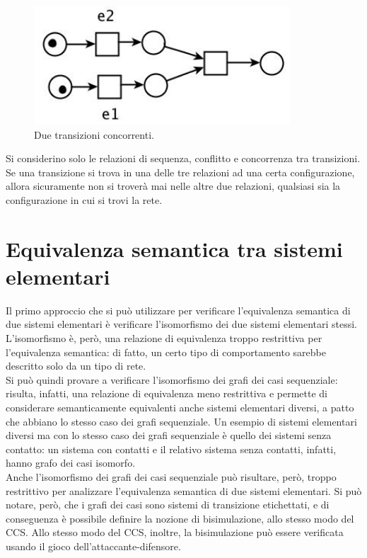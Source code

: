 \begin{figure}
    \centering
    \includegraphics[width=0.5\linewidth]{img/eventi_concorrenti.png}
    \caption{Due transizioni concorrenti.}
    \label{fig:eventi_concorrenti}
\end{figure}

\begin{thm}
    Si considerino solo le relazioni di sequenza, conflitto e concorrenza tra
    transizioni.
    Se una transizione si trova in una delle tre relazioni ad una certa configurazione,
    allora sicuramente non si troverà mai nelle altre due relazioni, qualsiasi
    sia la configurazione in cui si trovi la rete.
\end{thm}

\section{Equivalenza semantica tra sistemi elementari}
Il primo approccio che si può utilizzare per verificare l'equivalenza
semantica di due sistemi elementari è verificare l'isomorfismo
dei due sistemi elementari stessi. L'isomorfismo è, però, una relazione
di equivalenza troppo restrittiva per l'equivalenza semantica: di fatto,
un certo tipo di comportamento sarebbe descritto solo da un tipo di rete.\\
Si può quindi provare a verificare l'isomorfismo dei grafi dei casi
sequenziale: risulta, infatti, una relazione di equivalenza meno
restrittiva e permette di considerare semanticamente equivalenti anche
sistemi elementari diversi, a patto che abbiano lo stesso caso dei grafi
sequenziale. Un esempio di sistemi elementari diversi ma con lo stesso
caso dei grafi sequenziale è quello dei sistemi senza contatto: un sistema
con contatti e il relativo sistema senza contatti, infatti, hanno
grafo dei casi isomorfo.\\
Anche l'isomorfismo dei grafi dei casi sequenziale può risultare, però,
troppo restrittivo per analizzare l'equivalenza semantica di due sistemi
elementari. Si può notare, però, che i grafi dei casi sono sistemi
di transizione etichettati, e di conseguenza è possibile definire la nozione
di bisimulazione, allo stesso modo del CCS. Allo stesso modo del CCS,
inoltre, la bisimulazione può essere verificata usando il gioco
dell'attaccante-difensore.


